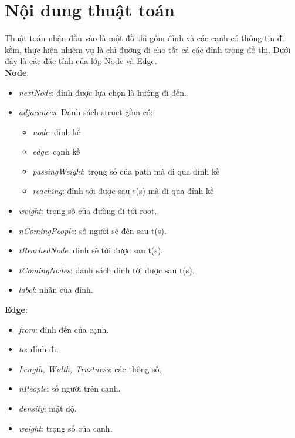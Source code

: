 \documentclass{article}
\begin{document}
    \section{Nội dung thuật toán}
    \newpage
    Thuật toán nhận đầu vào là một đồ thì gồm đỉnh và các cạnh có thông tin
    đi kềm, thực hiện nhiệm vụ là chỉ đường đi cho tất cả các đỉnh trong đồ
    thị. Dưới đây là các đặc tính của lớp Node và Edge. \\ 
    \textbf{Node}: 
    \begin{itemize}
        \item \textit{nextNode}: đỉnh được lựa chọn là hướng đi đến.
        \item \textit{adjacences}: Danh sách struct gồm có:
        \begin{itemize}
            \item \textit{node}: đỉnh kề
            \item \textit{edge}: cạnh kề
            \item \textit{passingWeight}: trọng số của path mà đi qua đỉnh kề 
            \item \textit{reaching}: đỉnh tới được sau t(s) mà đi qua đỉnh 
            kề
        \end{itemize}    
        \item \textit{weight}: trọng số của đường đi tới root.
        \item \textit{nComingPeople}: số người sẽ đến sau t(s).
        \item \textit{tReachedNode}: đỉnh sẽ tới được sau t(s).
        \item \textit{tComingNodes}: danh sách đỉnh tới được sau t(s).
        \item \textit{label}: nhãn của đỉnh.
    \end{itemize}
    \newpage
    \textbf{Edge}:
    \begin{itemize}
        \item \textit{from}: đỉnh đến của cạnh.
        \item \textit{to}: đỉnh đi.
        \item \textit{Length, Width, Trustness}: các thông số.
        \item \textit{nPeople}: số người trên cạnh.
        \item \textit{density}: mật độ.
        \item \textit{weight}: trọng số của cạnh.
    \end{itemize}
\end{document}
